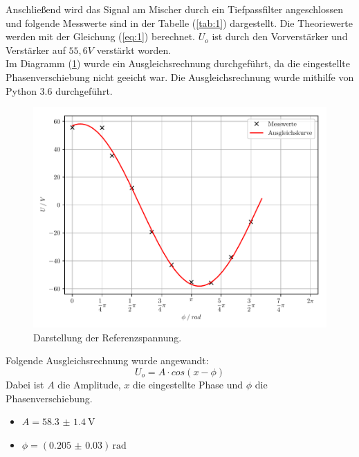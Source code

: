 Anschließend wird das Signal am Mischer durch ein Tiefpassfilter angeschlossen und folgende
Messwerte sind in der Tabelle (\ref{tab:1}) dargestellt.
Die Theoriewerte werden mit der Gleichung (\ref{eq:1}) berechnet.
$U_o$ ist durch den Vorverstärker und Verstärker auf $55,6 V$ verstärkt worden.\\
Im Diagramm (\ref{abb:5}) wurde ein Ausgleichsrechnung durchgeführt, da die eingestellte Phasenverschiebung
nicht geeicht war. Die Ausgleichsrechnung wurde mithilfe von Python 3.6 durchgeführt.
\begin{figure}[H]
	\centering
	\includegraphics[width=\textwidth]{kurve1.pdf}
	\caption{Darstellung der Referenzspannung.}
	\label{abb:5}
\end{figure}
Folgende Ausgleichsrechnung wurde angewandt:
\begin{equation}
	 U_o = A \cdot cos(x - \phi)
	 \label{eq:10}
 \end{equation}
Dabei ist $A$ die Amplitude, $x$ die eingestellte Phase und $\phi$ die Phasenverschiebung.
\begin{itemize}
	\item $A = \SI{58.3(14)}{\volt}$
	\item $\phi = (\num{0.205(30)}) \, \text{rad}$
\end{itemize}
